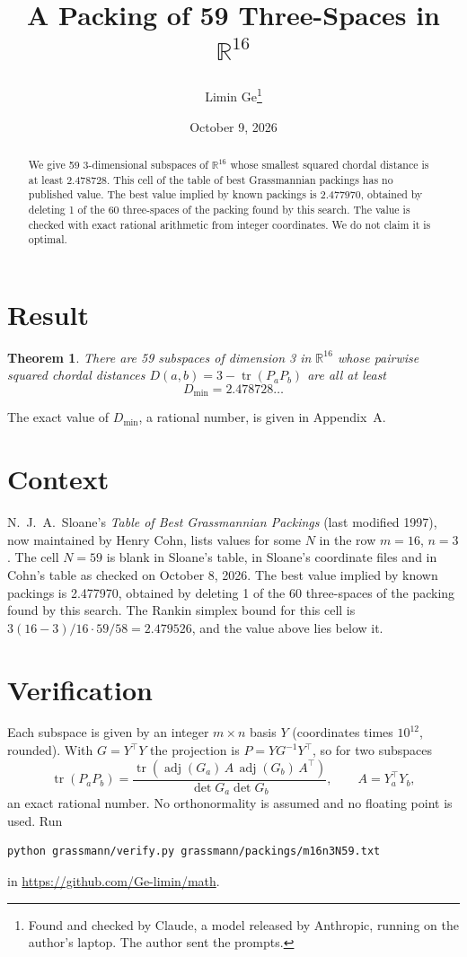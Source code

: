 \documentclass[11pt,a4paper]{article}
\title{A Packing of 59 Three-Spaces in $\mathbb{R}^{16}$}
\author{Limin Ge\thanks{Found and checked by Claude, a model released by Anthropic, running on the author's laptop. The author sent the prompts.}}
\date{October 9, 2026}
\newtheorem*{theorem}{Theorem}
\begin{document}
\maketitle
\begin{abstract}
We give 59 3-dimensional subspaces of $\mathbb{R}^{16}$ whose smallest squared chordal distance is at least 2.478728. This cell of the table of best Grassmannian packings has no published value. The best value implied by known packings is 2.477970, obtained by deleting 1 of the 60 three-spaces of the packing found by this search. The value is checked with exact rational arithmetic from integer coordinates. We do not claim it is optimal.
\end{abstract}

\section{Result}
\begin{theorem}
There are 59 subspaces of dimension 3 in $\mathbb{R}^{16}$ whose pairwise squared chordal distances $D(a,b) = 3 - \operatorname{tr}(P_aP_b)$ are all at least
\[ D_{\min} = 2.478728\ldots \]
\end{theorem}
The exact value of $D_{\min}$, a rational number, is given in Appendix~A.


\section{Context}
N.~J.~A.~Sloane's \emph{Table of Best Grassmannian Packings} (last modified 1997), now maintained by Henry Cohn, lists values for some $N$ in the row $m=16$, $n=3$. The cell $N=59$ is blank in Sloane's table, in Sloane's coordinate files and in Cohn's table as checked on October 8, 2026. The best value implied by known packings is 2.477970, obtained by deleting 1 of the 60 three-spaces of the packing found by this search. The Rankin simplex bound for this cell is $3(16-3)/16\cdot 59/58 = 2.479526$, and the value above lies below it.


\section{Verification}
Each subspace is given by an integer $m\times n$ basis $Y$ (coordinates times $10^{12}$, rounded). With $G=Y^\top Y$ the projection is $P=YG^{-1}Y^\top$, so for two subspaces
\[ \operatorname{tr}(P_aP_b)=\frac{\operatorname{tr}(\operatorname{adj}(G_a)\,A\,\operatorname{adj}(G_b)\,A^\top)}{\det G_a\det G_b},\qquad A=Y_a^\top Y_b, \]
an exact rational number. No orthonormality is assumed and no floating point is used. Run
\begin{verbatim}
python grassmann/verify.py grassmann/packings/m16n3N59.txt
\end{verbatim}
in \url{https://github.com/Ge-limin/math}.
\end{document}
